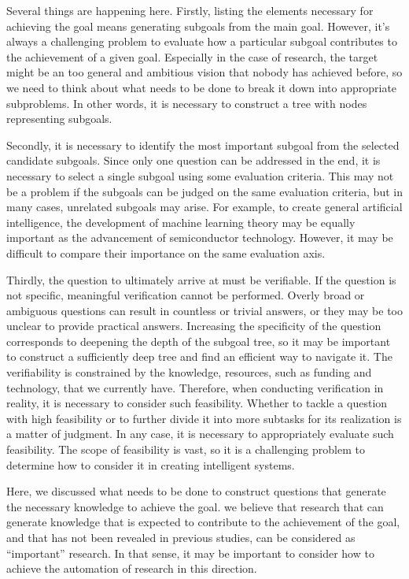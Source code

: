 \documentclass{book}
\begin{document}
Several things are happening here. Firstly, listing the elements necessary for achieving the goal means generating subgoals from the main goal. However, it's always a challenging problem to evaluate how a particular subgoal contributes to the achievement of a given goal. Especially in the case of research, the target might be an too general and ambitious vision that nobody has achieved before, so we need to think about what needs to be done to break it down into appropriate subproblems. In other words, it is necessary to construct a tree with nodes representing subgoals.

Secondly, it is necessary to identify the most important subgoal from the selected candidate subgoals. Since only one question can be addressed in the end, it is necessary to select a single subgoal using some evaluation criteria. This may not be a problem if the subgoals can be judged on the same evaluation criteria, but in many cases, unrelated subgoals may arise. For example, to create general artificial intelligence, the development of machine learning theory may be equally important as the advancement of semiconductor technology. However, it may be difficult to compare their importance on the same evaluation axis.

Thirdly, the question to ultimately arrive at must be verifiable. If the question is not specific, meaningful verification cannot be performed. Overly broad or ambiguous questions can result in countless or trivial answers, or they may be too unclear to provide practical answers. Increasing the specificity of the question corresponds to deepening the depth of the subgoal tree, so it may be important to construct a sufficiently deep tree and find an efficient way to navigate it. The verifiability is constrained by the knowledge, resources, such as funding and technology, that we currently have. Therefore, when conducting verification in reality, it is necessary to consider such feasibility. Whether to tackle a question with high feasibility or to further divide it into more subtasks for its realization is a matter of judgment. In any case, it is necessary to appropriately evaluate such feasibility. The scope of feasibility is vast, so it is a challenging problem to determine how to consider it in creating intelligent systems.

Here, we discussed what needs to be done to construct questions that generate the necessary knowledge to achieve the goal. we believe that research that can generate knowledge that is expected to contribute to the achievement of the goal, and that has not been revealed in previous studies, can be considered as ``important'' research. In that sense, it may be important to consider how to achieve the automation of research in this direction.
\end{document}
